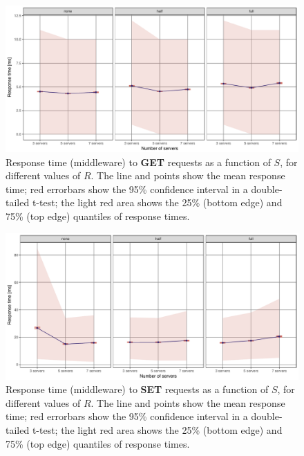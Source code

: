 \documentclass[11pt]{article}
\begin{document}
\begin{figure}[h]
\centering
\includegraphics[width=\textwidth]{../results/replication/graphs/response_time_vs_servers_get.pdf}
\caption{Response time (middleware) to \textbf{GET} requests as a function of $S$, for different values of $R$. The line and points show the mean response time; red errorbars show the 95\% confidence interval in a double-tailed t-test; the light red area shows the 25\% (bottom edge) and 75\% (top edge) quantiles of response times.}
\label{fig:exp2:res:servers:get}
\end{figure}
 

\begin{figure}[h]
\centering
\includegraphics[width=\textwidth]{../results/replication/graphs/response_time_vs_servers_set.pdf}
\caption{Response time (middleware) to \textbf{SET} requests as a function of $S$, for different values of $R$. The line and points show the mean response time; red errorbars show the 95\% confidence interval in a double-tailed t-test; the light red area shows the 25\% (bottom edge) and 75\% (top edge) quantiles of response times.}
\label{fig:exp2:res:servers:set}
\end{figure}
 

 \clearpage
\end{document}
